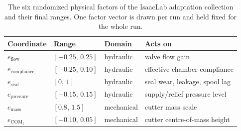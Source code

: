 \begin{table}[htbp]
  \centering
  \caption{The six randomized physical factors of the IsaacLab
  adaptation collection and their final ranges. One factor vector is
  drawn per run and held fixed for the whole run.}
  \label{tab:data:factors}
  \small
  \begin{tabular}{llll}
    \toprule
    Coordinate & Range & Domain & Acts on \\
    \midrule
    $e_{\mathrm{flow}}$       & $[-0.25,\, 0.25]$ & hydraulic  & valve flow gain \\
    $e_{\mathrm{compliance}}$ & $[-0.25,\, 0.10]$ & hydraulic  & effective chamber compliance \\
    $e_{\mathrm{seal}}$       & $[0,\, 1]$        & hydraulic  & seal wear, leakage, spool lag \\
    $e_{\mathrm{pressure}}$   & $[-0.15,\, 0.15]$ & hydraulic  & supply/relief pressure level \\
    $e_{\mathrm{mass}}$       & $[0.8,\, 1.5]$    & mechanical & cutter mass scale \\
    $e_{\mathrm{COM}_z}$      & $[-0.10,\, 0.05]$ & mechanical & cutter centre-of-mass height \\
    \bottomrule
  \end{tabular}
\end{table}

